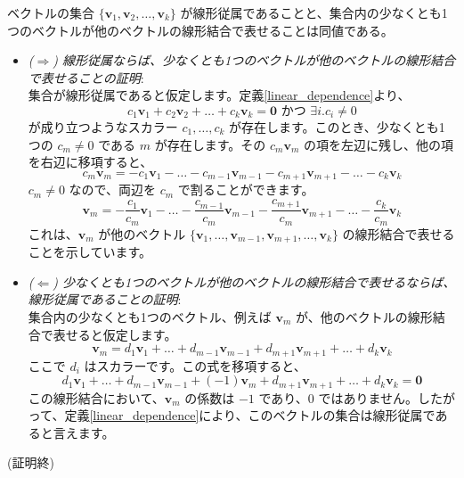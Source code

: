 \begin{thm}[線形従属の判定条件] \label{criteria_for_linear_dependence}
ベクトルの集合 $\{\bm{v}_1, \bm{v}_2, \ldots, \bm{v}_k\}$ が線形従属であることと、集合内の少なくとも1つのベクトルが他のベクトルの線形結合で表せることは同値である。
\begin{proof*}
\begin{itemize}
	\item \emph{($\Rightarrow$) 線形従属ならば、少なくとも1つのベクトルが他のベクトルの線形結合で表せることの証明}:\\
    集合が線形従属であると仮定します。定義\ref{linear_dependence}より、
    \[c_1 \bm{v}_1 + c_2 \bm{v}_2 + \dots + c_k \bm{v}_k = \bm{0}\text{ かつ }\exists i. c_i\neq0\]
    が成り立つようなスカラー $c_1, \ldots, c_k$ が存在します。このとき、少なくとも1つの $c_m \neq 0$ である $m$ が存在します。その $c_m \bm{v}_m$ の項を左辺に残し、他の項を右辺に移項すると、
    \[c_m \bm{v}_m = -c_1 \bm{v}_1 - \dots - c_{m-1} \bm{v}_{m-1} - c_{m+1} \bm{v}_{m+1} - \dots - c_k \bm{v}_k\]
    $c_m \neq 0$ なので、両辺を $c_m$ で割ることができます。
    \[\bm{v}_m = -\frac{c_1}{c_m} \bm{v}_1 - \dots - \frac{c_{m-1}}{c_m} \bm{v}_{m-1} - \frac{c_{m+1}}{c_m} \bm{v}_{m+1} - \dots - \frac{c_k}{c_m} \bm{v}_k\]
    これは、$\bm{v}_m$ が他のベクトル $\{\bm{v}_1, \ldots, \bm{v}_{m-1}, \bm{v}_{m+1}, \ldots, \bm{v}_k\}$ の線形結合で表せることを示しています。
	\item \emph{($\Leftarrow$) 少なくとも1つのベクトルが他のベクトルの線形結合で表せるならば、線形従属であることの証明}:\\
	集合内の少なくとも1つのベクトル、例えば $\bm{v}_m$ が、他のベクトルの線形結合で表せると仮定します。
    \[\bm{v}_m = d_1 \bm{v}_1 + \dots + d_{m-1} \bm{v}_{m-1} + d_{m+1} \bm{v}_{m+1} + \dots + d_k \bm{v}_k\]
    ここで $d_i$ はスカラーです。この式を移項すると、
    \[d_1 \bm{v}_1 + \dots + d_{m-1} \bm{v}_{m-1} + (-1)\bm{v}_m + d_{m+1} \bm{v}_{m+1} + \dots + d_k \bm{v}_k = \bm{0}\]
    この線形結合において、$\bm{v}_m$ の係数は $-1$ であり、$0$ ではありません。したがって、定義\ref{linear_dependence}により、このベクトルの集合は線形従属であると言えます。
\end{itemize}
(証明終)
\end{proof*}
\end{thm}

